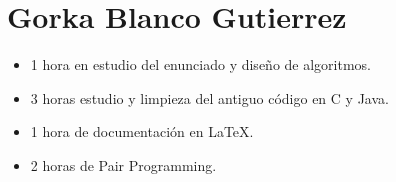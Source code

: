     \section{Gorka Blanco Gutierrez}
    
        \begin{itemize}
            \item 1 hora en estudio del enunciado y diseño de algoritmos.
            \item 3 horas estudio y limpieza del antiguo código en C y Java.
            \item 1 hora de documentación en \LaTeX.
            \item 2 horas de Pair Programming.
        \end{itemize}